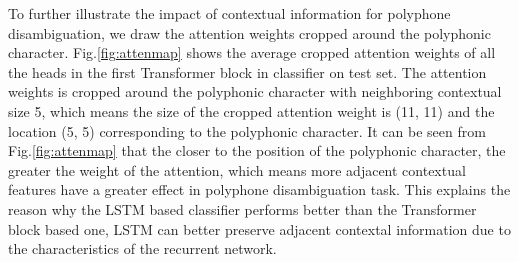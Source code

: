 \documentclass[a4paper]{article}
\begin{document}

To further illustrate the impact of contextual information for polyphone disambiguation, we draw the attention weights cropped around the polyphonic character. Fig.\ref{fig:attenmap} shows the average cropped attention weights of all the heads in the first Transformer block in classifier on test set. The attention weights is cropped around the polyphonic character with neighboring contextual size 5, which means the size of the cropped attention weight is (11, 11) and the location (5, 5) corresponding to the polyphonic character. It can be seen from Fig.\ref{fig:attenmap} that the closer to the position of the polyphonic character, the greater the weight of the attention, which means more adjacent contextual features have a greater effect in polyphone disambiguation task. This explains the reason why the LSTM based classifier performs better than the Transformer block based one, LSTM can better preserve adjacent contextal information due to the characteristics of the recurrent network.

\end{document}
